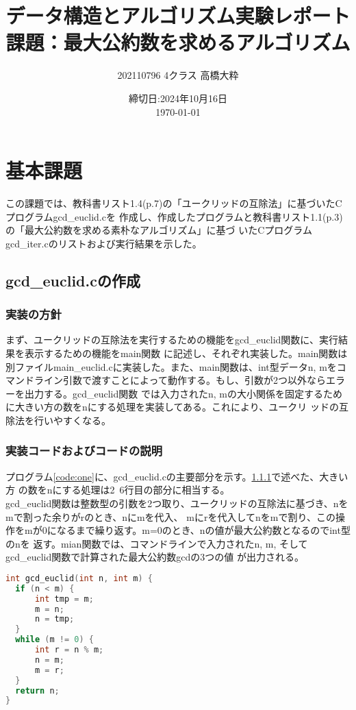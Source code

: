 \documentclass{ltjsarticle}
\begin{document}
\title{データ構造とアルゴリズム実験レポート\\
課題：最大公約数を求めるアルゴリズム}
\author{202110796 4クラス 高橋大粋}
\date{締切日:2024年10月16日\\
\today}
\maketitle

\section{基本課題}
この課題では、教科書リスト1.4(p.7)の「ユークリッドの互除法」に基づいたCプログラムgcd\_euclid.cを
作成し、作成したプログラムと教科書リスト1.1(p.3)の「最大公約数を求める素朴なアルゴリズム」に基づ
いたCプログラムgcd\_iter.cのリストおよび実行結果を示した。 
\subsection{gcd\_euclid.cの作成}
\subsubsection{実装の方針}\label{subsubsec:実装の方針}
まず、ユークリッドの互除法を実行するための機能をgcd\_euclid関数に、実行結果を表示するための機能をmain関数
に記述し、それぞれ実装した。main関数は別ファイルmain\_euclid.cに実装した。また、main関数は、int型データn,
mをコマンドライン引数で渡すことによって動作する。もし、引数が2つ以外ならエラーを出力する。gcd\_euclid関数
では入力されたn, mの大小関係を固定するために大きい方の数をnにする処理を実装してある。これにより、ユークリ
ッドの互除法を行いやすくなる。
\subsubsection{実装コードおよびコードの説明}
プログラム\ref{code:one}に、gcd\_euclid.cの主要部分を示す。\ref{subsubsec:実装の方針}で述べた、大きい方
の数をnにする処理は2~6行目の部分に相当する。\\
gcd\_euclid関数は整数型の引数を2つ取り、ユークリッドの互除法に基づき、nをmで割った余りがrのとき、nにmを代入、
mにrを代入してnをmで割り、この操作をmが0になるまで繰り返す。m=0のとき、nの値が最大公約数となるのでint型のnを
返す。mian関数では、コマンドラインで入力されたn, m, そしてgcd\_euclid関数で計算された最大公約数gcdの3つの値
が出力される。
\begin{lstlisting}[caption=gcd\_euclid.cの主要部, label=code:one, language=C]
int gcd_euclid(int n, int m) {
  if (n < m) {
      int tmp = m;
      m = n;
      n = tmp;
  }
  while (m != 0) {
      int r = n % m;
      n = m;
      m = r;
  }
  return n;
}
\end{lstlisting}
\end{document}
